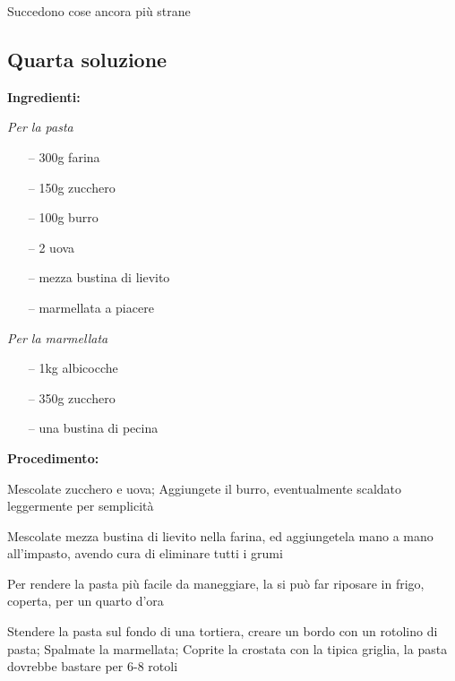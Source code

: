 \documentclass[a4paper,11pt]{book}
\begin{document}
Succedono cose ancora pi\`u strane

\subsection{Quarta soluzione}

\textbf{Ingredienti:}

\emph{Per la pasta}
\begin{itemize}[itemsep=1pt]
    \item[--] 300g farina
    \item[--] 150g zucchero
    \item[--] 100g burro
    \item[--] 2 uova
    \item[--] mezza bustina di lievito
    \item[--] marmellata a piacere
\end{itemize}

\emph{Per la marmellata}
\begin{itemize}[itemsep=1pt]
    \item[--] 1kg albicocche
    \item[--] 350g zucchero
    \item[--] una bustina di pecina
\end{itemize}

\textbf{Procedimento:}

Mescolate zucchero e uova;
Aggiungete il burro, eventualmente scaldato leggermente per semplicit\`a

Mescolate mezza bustina di lievito nella farina, ed aggiungetela mano a mano all'impasto, avendo cura di eliminare tutti i grumi

Per rendere la pasta pi\`u facile da maneggiare, la si pu\`o far riposare in frigo, coperta, per un quarto d'ora

Stendere la pasta sul fondo di una tortiera, creare un bordo con un rotolino di pasta;
Spalmate la marmellata;
Coprite la crostata con la tipica griglia, la pasta dovrebbe bastare per 6-8 rotoli
\end{document}

